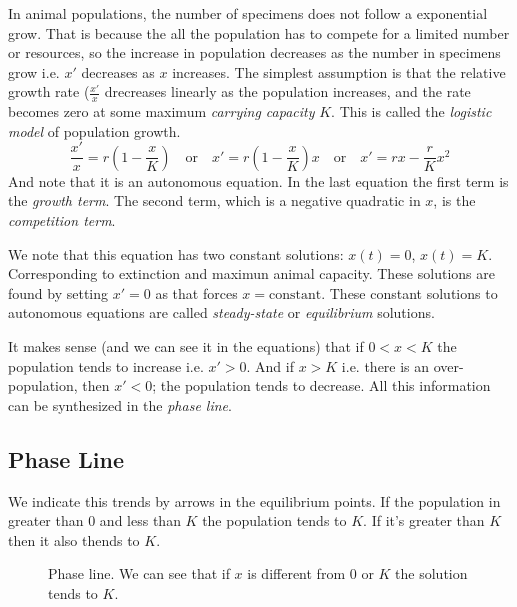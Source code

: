 \documentclass[../ode.tex]{subfiles}
\begin{document}
    In animal populations, the number of specimens does not follow a exponential grow. That is because the all the population has
    to compete for a limited number or resources, so the increase in population decreases as the number in specimens grow i.e. $x'$ 
    decreases as $x$ increases. The simplest assumption is that the relative growth rate ($\frac{x'}{x}$ drecreases linearly as
    the  population increases, and the rate becomes zero at some maximum \emph{carrying capacity} $K$. This is called the
    \emph{logistic model}  of population growth.
    \begin{equation*}
        \frac{x'}{x} = r(1-\frac{x}{K}) \quad \text{or}  \quad x' = r(1-\frac{x}{K})x\quad \text{or}  \quad 
        x' = rx - \frac{r}{K}x ^{2}
    \end{equation*}
    And note that it is an autonomous equation. In the last equation the first term is the \emph{growth term}. The second term,
    which is a negative quadratic in $x$, is the \emph{competition term}. 

    We note that this equation has two constant solutions: $x(t) = 0$, $x(t)=K$. Corresponding to extinction and
    maximun animal capacity. These solutions are found by setting $x'=0$ as that forces $x= \text{constant} $. These constant
    solutions to autonomous equations are called \emph{steady-state} or \emph{equilibrium} solutions.

    It makes sense (and we can see it in the equations) that if $0<x<K$ the population tends to increase i.e. $x'>0$. And if  $x>K$ 
    i.e. there is an over-population, then $x'<0$; the population tends to decrease. All this information can be synthesized in
    the \emph{phase line}. 

    \subsection{\sffamily Phase Line}
    
    We indicate this trends by arrows in the equilibrium points. If the population in greater than $0$ and
    less than $K$ the population tends to $K$. If it's greater than $K$ then it also thends to $K$. 

    \begin{figure}[ht]
        \centering
        \caption{Phase line. We can see that if $x$ is different from $0$ or $K$ the solution tends to $K$.}
        \label{fig:phaseline}
    \end{figure}
    
\end{document}

